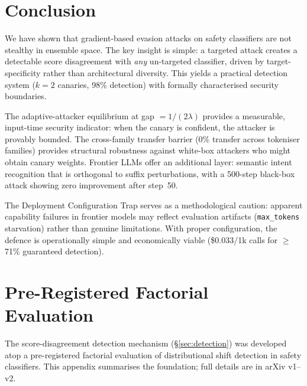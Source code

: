 \documentclass{article}
\begin{document}
\section{Conclusion}
\label{sec:conclusion}

We have shown that gradient-based evasion attacks on safety classifiers are not stealthy in ensemble space. The key insight is simple: a targeted attack creates a detectable score disagreement with \emph{any} un-targeted classifier, driven by target-specificity rather than architectural diversity. This yields a practical detection system ($k{=}2$ canaries, 98\% detection) with formally characterised security boundaries.

The adaptive-attacker equilibrium at gap $= 1/(2\lambda)$ provides a measurable, input-time security indicator: when the canary is confident, the attacker is provably bounded. The cross-family transfer barrier (0\% transfer across tokeniser families) provides structural robustness against white-box attackers who might obtain canary weights. Frontier LLMs offer an additional layer: semantic intent recognition that is orthogonal to suffix perturbations, with a 500-step black-box attack showing zero improvement after step~50.

The Deployment Configuration Trap serves as a methodological caution: apparent capability failures in frontier models may reflect evaluation artifacts (\texttt{max\_tokens} starvation) rather than genuine limitations. With proper configuration, the defence is operationally simple and economically viable (\$0.033/1k calls for $\geq$71\% guaranteed detection).





\appendix

\section{Pre-Registered Factorial Evaluation}
\label{app:factorial}

The score-disagreement detection mechanism (\S\ref{sec:detection}) was developed atop a pre-registered factorial evaluation of distributional shift detection in safety classifiers. This appendix summarises the foundation; full details are in arXiv v1--v2.
\end{document}

